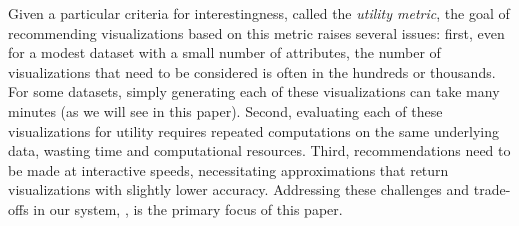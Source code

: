 

Given a particular criteria for interestingness, called the {\em utility metric},
the goal of recommending visualizations based on this metric 
raises several issues:
first, even for a modest dataset with a small number
of attributes, the number of  
visualizations that need to be considered is often in the hundreds or thousands.
For some datasets, simply generating each of these visualizations can take many minutes 
(as we will see in this paper).
Second, evaluating each of these visualizations for utility requires repeated
computations on the same underlying data, wasting time and computational resources.
Third, recommendations need to be made at interactive speeds,
necessitating approximations that return visualizations with slightly lower accuracy. 
Addressing these challenges and trade-offs in our system, \SeeDB, 
is the primary focus of this paper. 






